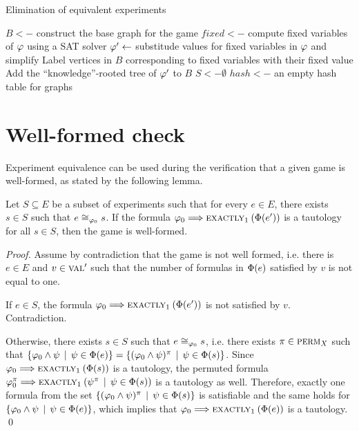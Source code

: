 \begin{algorithm}[h!]
\caption{Elimination of equivalent experiments}
\label{alg:noneqexp}
\DontPrintSemicolon
$B <-$ construct the base graph for the game\;
$fixed <-$ compute fixed variables of $\varphi$ using a SAT solver\;
$\varphi' <- $ substitude values for fixed variables in $\varphi$ and simplify\;
Label vertices in $B$ corresponding to fixed variables with their fixed value\;
Add the ``knowledge''-rooted tree of $\varphi'$ to $B$\;
$S <- \emptyset$\;
$hash <- $ an empty hash table for graphs\;
\end{algorithm}

\pagebreak
\section{Well-formed check}

Experiment equivalence can be used during the verification
  that a given game is well-formed, as stated by the following lemma.

\begin{lemma} \label{lma:well-formed}
  Let $S\subseteq E$ be a subset of experiments
  such that for every $e\in E$, there exists $s\in S$
   such that $e\cong_{\varphi_0}s$.
  If the formula $\varphi_0 ==> \textsc{exactly}_{1}\:(\Phi(e'))$ is a tautology for
  all $s\in S$, then the game is well-formed.
\end{lemma}

\begin{proof}
Assume by contradiction that the game is not well formed, i.e.
  there is $e\in E$ and $v \in \textsc{val}'$ such that the number of
  formulas in $\Phi(e)$ satisfied by $v$ is not equal to one.

If $e\in S$, the formula $\varphi_0 ==> \textsc{exactly}_{1}\:(\Phi(e'))$ is not
  satisfied by $v$. Contradiction.

Otherwise, there exists $s\in S$ such that $e\cong_{\varphi_0}s$, i.e.
  there exists $\pi\in\textsc{perm}_X$ such that
$\{ \varphi_0\wedge\psi \:\:|\:\: \psi\in\Phi(e) \} =
 \{ (\varphi_0\wedge\psi)^\pi \:\:|\:\: \psi\in\Phi(s) \}$.
Since $\varphi_0 ==> \textsc{exactly}_{1}\:(\Phi(s))$ is a tautology,
  the permuted formula
  $\varphi_0^\pi ==> \textsc{exactly}_{1}\:(\psi^\pi \:\:|\:\: \psi\in\Phi(s))$
  is a tautology as well.
Therefore, exactly one formula from the set
 $ \{ (\varphi_0\wedge\psi)^\pi \:\:|\:\: \psi\in\Phi(s) \}$
 is satisfiable and the same holds for
  $\{ \varphi_0\wedge\psi \:\:|\:\: \psi\in\Phi(e) \}$,
 which implies that
 $\varphi_0 ==> \textsc{exactly}_{1}\:(\Phi(e))$
 is a tautology. \qed
\end{proof}

